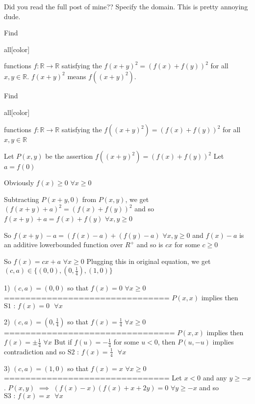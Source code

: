\begin{solution}
	Did you read the full post of mine?? Specify the domain. This is pretty annoying dude.
\end{solution}



\begin{solution}
	Find \begin{bolded}[color=#FF0000]all[\/color]\end{bolded} functions $f:\mathbb{R}\to \mathbb{R}$ satisfying the $f{(x+y)^2} = {(f(x) + f(y))^2}$ for all $x,y\in \mathbb{R}$.
$f{{(x+y)}^{2}}$ means $f({{(x+y)}^{2}})$.
\end{solution}



\begin{solution}
	\begin{tcolorbox}Find \begin{bolded}[color=#FF0000]all[\/color]\end{bolded} functions $f:\mathbb{R}\to \mathbb{R}$ satisfying the $f((x+y)^2) = {(f(x) + f(y))^2}$ for all $x,y\in \mathbb{R}$\end{tcolorbox}
Let $P(x,y)$ be the assertion $f((x+y)^2)=(f(x)+f(y))^2$
Let $a=f(0)$

Obviously $f(x)\ge 0$ $\forall x\ge 0$

Subtracting $P(x+y,0)$ from $P(x,y)$, we get $(f(x+y)+a)^2=(f(x)+f(y))^2$ and so $f(x+y)+a=f(x)+f(y)$ $\forall x,y\ge 0$

So $f(x+y)-a=(f(x)-a)+(f(y)-a)$ $\forall x,y\ge 0$ and $f(x)-a$ is an additive lowerbounded function over $R^+$ and so is $cx$ for some $c\ge 0$

So $f(x)=cx+a$ $\forall x\ge 0$
Plugging this in original equation, we get $(c,a)\in\{(0,0),(0,\frac 14),(1,0)\}$

1) $(c,a)=(0,0)$ so that $f(x)=0$ $\forall x\ge 0$
===============================
$P(x,x)$ implies then $\boxed{\text{S1 : }f(x)=0\text{   }\forall x}$

2) $(c,a)=(0,\frac 14)$ so that $f(x)=\frac 14$ $\forall x\ge 0$
================================
$P(x,x)$ implies then $f(x)=\pm\frac 14$ $\forall x$
But if $f(u)=-\frac 14$ for some $u<0$, then $P(u,-u)$ implies contradiction  and so $\boxed{\text{S2 : }f(x)=\frac 14\text{   }\forall x}$

3) $(c,a)=(1,0)$ so that $f(x)=x$ $\forall x\ge 0$
===============================
Let $x<0$ and any $y\ge -x$. $P(x,y)$ $\implies$ $(f(x)-x)(f(x)+x+2y)=0$ $\forall y\ge -x$ and so $\boxed{\text{S3 : }f(x)=x\text{   }\forall x}$
\end{solution}



